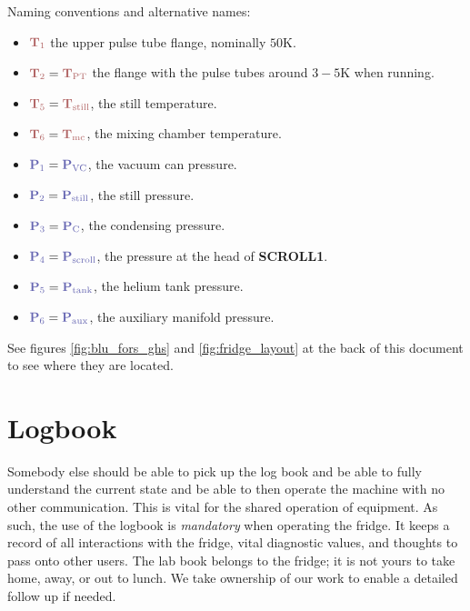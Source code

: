 \documentclass{article}[18pt,A4]
\newcommand{\kelvin}{\mathrm{K}}
\newcommand{\thing}[1]{{\color{gray}\textsc{ \textbf{#1}}}}
\newcommand{\pressure}[1]{{\color{pressurecolor}\textbf{P}\textsubscript{#1}}}
\newcommand{\temperature}[1]{{\color{temperaturecolor}\textbf{T}\textsubscript{#1}}}
\begin{document}
Naming conventions and alternative names:
\begin{itemize}
\item $\temperature{1}$ the upper pulse tube flange, nominally $50\kelvin$.
\item $\temperature{2} = \temperature{PT}$ the flange with the pulse tubes around $3-5\kelvin$ when running.
\item $\temperature{5} = \temperature{still}$, the still temperature.
\item $\temperature{6} = \temperature{mc}$, the mixing chamber temperature.

\item $\pressure{1} = \pressure{VC}$, the vacuum can pressure.
\item $\pressure{2} = \pressure{still}$, the still pressure.
\item $\pressure{3} = \pressure{C}$, the condensing pressure.
\item $\pressure{4} = \pressure{scroll}$, the pressure at the head of \thing{SCROLL1}.
\item $\pressure{5} = \pressure{tank}$, the helium tank pressure.
\item $\pressure{6} = \pressure{aux}$, the auxiliary manifold pressure.
\end{itemize}
See figures \ref{fig:blu_fors_ghs} and \ref{fig:fridge_layout} at the back of this document to see where they are located.


\newpage
\section{Logbook}
Somebody else should be able to pick up the log book and be able to fully understand the current state and
be able to then operate the machine with no other communication.
This is vital for the shared operation of equipment.
As such, the use of the logbook is \emph{mandatory} when operating the fridge.
It keeps a record of all interactions with the fridge, vital diagnostic values, and thoughts to pass onto
other users. The lab book belongs to the fridge; it is not yours to take home, away, or out to lunch. 
We take ownership of our work to enable a detailed follow up if needed. 
\end{document}
